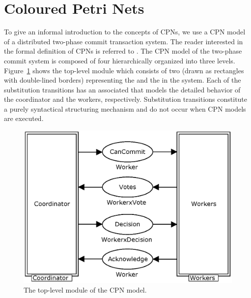 \section{Coloured Petri Nets}
\label{sect:language}


To give an informal introduction to the concepts of CPNs, we use a CPN
model of a distributed two-phase commit transaction
system. The
reader interested in the formal definition of CPNs is referred to
\cite{newcpnbook}. The CPN model of the two-phase commit system is
composed of four  hierarchically organized into three
levels. Figure~\ref{fig:commit} shows the top-level module which
consists of two  (drawn as
rectangles with double-lined borders) representing the
 and the  in the system. Each of
the substitution transitions has an associated 
that models the detailed behavior of the coordinator and the workers,
respectively. Substitution transitions constitute a purely
syntactical structuring mechanism and do not occur when CPN models are
executed.

\begin{figure}[b]
\centering
\includegraphics[scale=.43]{figures/Commit.eps}
\caption{The top-level module of the CPN model.}
\label{fig:commit}
\end{figure}

